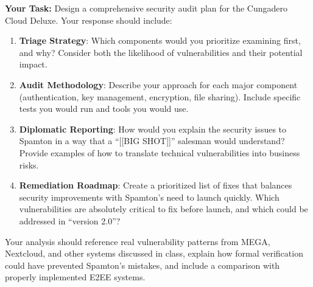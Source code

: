 \documentclass[10pt,a4paper,american]{exam}
\begin{document}
\begin{tcolorbox}[colframe=EarthBrown!30!white,colback=EarthBrown!5!white]
	\textbf{Your Task:} Design a comprehensive security audit plan for the Cungadero Cloud Deluxe. Your response should include:
	\begin{enumerate}
		\item \textbf{Triage Strategy}: Which components would you prioritize examining first, and why? Consider both the likelihood of vulnerabilities and their potential impact.
		\item \textbf{Audit Methodology}: Describe your approach for each major component (authentication, key management, encryption, file sharing). Include specific tests you would run and tools you would use.
		\item \textbf{Diplomatic Reporting}: How would you explain the security issues to Spamton in a way that a ``[[BIG SHOT]]'' salesman would understand? Provide examples of how to translate technical vulnerabilities into business risks.
		\item \textbf{Remediation Roadmap}: Create a prioritized list of fixes that balances security improvements with Spamton's need to launch quickly. Which vulnerabilities are absolutely critical to fix before launch, and which could be addressed in ``version 2.0''?
	\end{enumerate}

	Your analysis should reference real vulnerability patterns from MEGA, Nextcloud, and other systems discussed in class, explain how formal verification could have prevented Spamton's mistakes, and include a comparison with properly implemented E2EE systems.
\end{tcolorbox}
\end{document}

